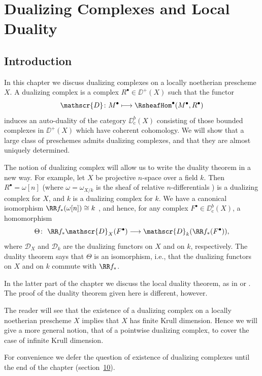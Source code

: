 
\chapter{Dualizing Complexes and Local Duality}
\setcounter{section}{-1}

\section{Introduction}\label{sec:5.0}

In this chapter we discuss dualizing complexes on a locally noetherian prescheme $X$. A dualizing complex is a complex $R^\bullet\in\DD^+(X)$ such that the functor
\[
\mathscr{D}\colon M^{\bullet}\longmapsto \RsheafHom^\bullet(M^{\bullet},R^{\bullet})
\]
induces an auto-duality of the category $\DD_{\mathrm{c}}^{b}(X)$ consisting of those bounded complexes in $\DD^+(X)$ which have coherent cohomology. We will show that a large class of preschemes admits dualizing complexes, and that they are almost uniquely determined.

The notion of dualizing complex will allow us to write the duality theorem in a new way. For example, let $X$ be projective $n$-space over a field $k$. Then $R^\bullet=\omega[n]$ (where $\omega=\omega_{X/k}$ is the sheaf of relative $n$-differentials ) is a dualizing complex for $X$, and $k$ is a dualizing complex for $k$. We have a canonical isomorphism $\RR f_*(\omega[n])\cong k$ , and hence, for any complex $F^\bullet\in\DD^b_{\mathrm{c}}(X)$, a homomorphism
\[
\Theta\colon\ \RR f_* \mathscr{D}_X(F^\bullet)\longrightarrow \mathscr{D}_k(\RR f_*(F^\bullet)),
\]
where $\mathscr{D}_X$ and $\mathscr{D}_k$ are the dualizing functors on $X$ and on $k$, respectively. The duality theorem  says that $\Theta$ is an isomorphism, i.e., that the dualizing functors on $X$ and on $k$ commute with $\RR f_*$.

In the latter part of the chapter we discuss the local duality theorem, as in \cite[\nopp \S\S2,4,6]{LC} or \cite[, expos\'es~2,4]{SGA}. The proof of the duality theorem given here is different, however.

The reader will see that the existence of a dualizing complex on a locally noetherian prescheme $X$ implies that $X$ has finite Krull dimension. Hence we will give a more general notion, that of a pointwise dualizing complex, to cover the case of infinite Krull dimension.

For convenience we defer the question of existence of dualizing complexes until the end of the chapter (section~\hyperref[sec:5.10]{10}).

